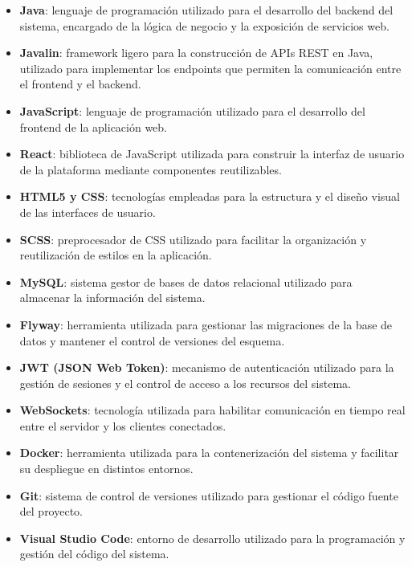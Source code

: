 \begin{itemize}

\item \textbf{Java}: lenguaje de programación utilizado para el desarrollo del backend del sistema, encargado de la lógica de negocio y la exposición de servicios web.

\item \textbf{Javalin}: framework ligero para la construcción de APIs REST en Java, utilizado para implementar los endpoints que permiten la comunicación entre el frontend y el backend.

\item \textbf{JavaScript}: lenguaje de programación utilizado para el desarrollo del frontend de la aplicación web.

\item \textbf{React}: biblioteca de JavaScript utilizada para construir la interfaz de usuario de la plataforma mediante componentes reutilizables.

\item \textbf{HTML5 y CSS}: tecnologías empleadas para la estructura y el diseño visual de las interfaces de usuario.

\item \textbf{SCSS}: preprocesador de CSS utilizado para facilitar la organización y reutilización de estilos en la aplicación.

\item \textbf{MySQL}: sistema gestor de bases de datos relacional utilizado para almacenar la información del sistema.

\item \textbf{Flyway}: herramienta utilizada para gestionar las migraciones de la base de datos y mantener el control de versiones del esquema.

\item \textbf{JWT (JSON Web Token)}: mecanismo de autenticación utilizado para la gestión de sesiones y el control de acceso a los recursos del sistema.

\item \textbf{WebSockets}: tecnología utilizada para habilitar comunicación en tiempo real entre el servidor y los clientes conectados.

\item \textbf{Docker}: herramienta utilizada para la contenerización del sistema y facilitar su despliegue en distintos entornos.

\item \textbf{Git}: sistema de control de versiones utilizado para gestionar el código fuente del proyecto.

\item \textbf{Visual Studio Code}: entorno de desarrollo utilizado para la programación y gestión del código del sistema.

\end{itemize}

